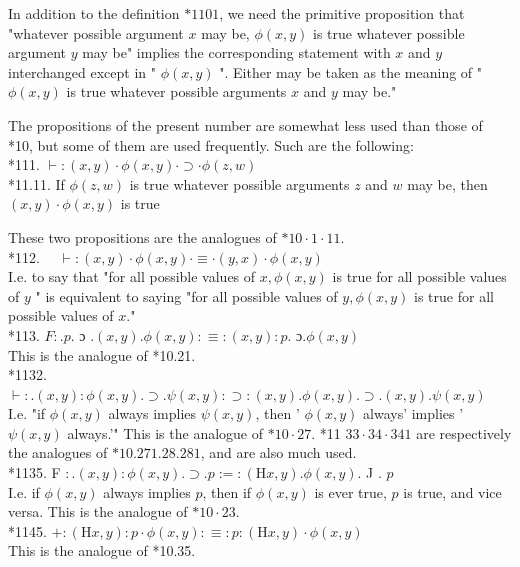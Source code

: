 \documentclass[10pt]{article}
\begin{document}
In addition to the definition $* 1101$, we need the primitive proposition that "whatever possible argument $x$ may be, $\phi(x, y)$ is true whatever possible argument $y$ may be" implies the corresponding statement with $x$ and $y$ interchanged except in " $\phi(x, y)$ ". Either may be taken as the meaning of " $\phi(x, y)$ is true whatever possible arguments $x$ and $y$ may be."

The propositions of the present number are somewhat less used than those of *10, but some of them are used frequently. Such are the following:\\
*111. $\vdash:(x, y) \cdot \phi(x, y) \cdot \supset \cdot \phi(z, w)$\\
*11.11. If $\phi(z, w)$ is true whatever possible arguments $z$ and $w$ may be, then $(x, y) \cdot \phi(x, y)$ is true

These two propositions are the analogues of $* 10 \cdot 1 \cdot 11$.\\
*112. $\quad \vdash:(x, y) \cdot \phi(x, y) \cdot \equiv \cdot(y, x) \cdot \phi(x, y)$\\
I.e. to say that "for all possible values of $x, \phi(x, y)$ is true for all possible values of $y$ " is equivalent to saying "for all possible values of $y, \phi(x, y)$ is true for all possible values of $x$."\\
*113. $F: . p$. ɔ $.(x, y) . \phi(x, y): \equiv:(x, y): p$. ɔ.$\phi(x, y)$\\
This is the analogue of *10.21.\\
*1132. $\vdash: .(x, y): \phi(x, y) . \supset . \psi(x, y): \supset:(x, y) . \phi(x, y) . \supset .(x, y) . \psi(x, y)$\\
I.e. "if $\phi(x, y)$ always implies $\psi(x, y)$, then ' $\phi(x, y)$ always' implies ' $\psi(x, y)$ always.'" This is the analogue of $* 10 \cdot 27$. *11 $33 \cdot 34 \cdot 341$ are respectively the analogues of $* 10.271 .28 .281$, and are also much used.\\
*1135. F $: .(x, y): \phi(x, y) . \supset . p:=:(\mathrm{H} x, y) . \phi(x, y)$. J . $p$\\
I.e. if $\phi(x, y)$ always implies $p$, then if $\phi(x, y)$ is ever true, $p$ is true, and vice versa. This is the analogue of $* 10 \cdot 23$.\\
*1145. $+:(\mathrm{H} x, y): p \cdot \phi(x, y): \equiv: p:(\mathrm{H} x, y) \cdot \phi(x, y)$\\
This is the analogue of *10.35.
\end{document}
